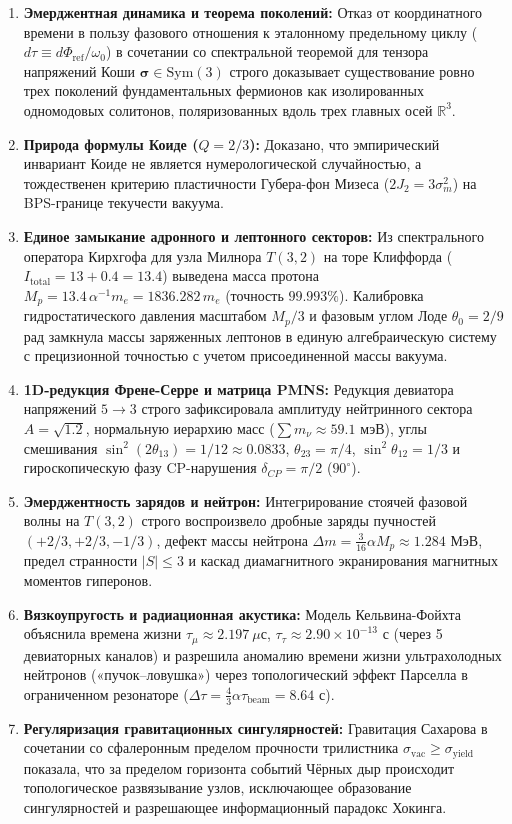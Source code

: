 \documentclass[12pt,a4paper]{article}
\begin{document}
\begin{enumerate}
	\item \textbf{Эмерджентная динамика и теорема поколений:} Отказ от координатного времени в пользу фазового отношения к эталонному предельному циклу ($d\tau \equiv d\Phi_{\text{ref}}/\omega_0$) в сочетании со спектральной теоремой для тензора напряжений Коши $\boldsymbol{\sigma} \in \mathrm{Sym}(3)$ строго доказывает существование ровно трех поколений фундаментальных фермионов как изолированных одномодовых солитонов, поляризованных вдоль трех главных осей $\mathbb{R}^3$.
	\item \textbf{Природа формулы Коиде ($Q = 2/3$):} Доказано, что эмпирический инвариант Коиде не является нумерологической случайностью, а тождественен критерию пластичности Губера-фон Мизеса ($2J_2 = 3\sigma_m^2$) на BPS-границе текучести вакуума.
	\item \textbf{Единое замыкание адронного и лептонного секторов:} Из спектрального оператора Кирхгофа для узла Милнора $T(3,2)$ на торе Клиффорда ($I_{\text{total}} = 13 + 0.4 = 13.4$) выведена масса протона $M_p = 13.4 \, \alpha^{-1} m_e = 1836.282 \, m_e$ (точность $99.993\%$). Калибровка гидростатического давления масштабом $M_p/3$ и фазовым углом Лоде $\theta_0 = 2/9$ рад замкнула массы заряженных лептонов в единую алгебраическую систему с прецизионной точностью с учетом присоединенной массы вакуума.
	\item \textbf{1D-редукция Френе-Серре и матрица PMNS:} Редукция девиатора напряжений $5 \to 3$ строго зафиксировала амплитуду нейтринного сектора $A = \sqrt{1.2}$, нормальную иерархию масс ($\sum m_\nu \approx 59.1$ мэВ), углы смешивания $\sin^2(2\theta_{13}) = 1/12 \approx 0.0833$, $\theta_{23} = \pi/4$, $\sin^2\theta_{12} = 1/3$ и гироскопическую фазу CP-нарушения $\delta_{CP} = \pi/2$ ($90^\circ$).
	\item \textbf{Эмерджентность зарядов и нейтрон:} Интегрирование стоячей фазовой волны на $T(3,2)$ строго воспроизвело дробные заряды пучностей $(+2/3, +2/3, -1/3)$, дефект массы нейтрона $\Delta m = \frac{3}{16}\alpha M_p \approx 1.284$ МэВ, предел странности $|S| \le 3$ и каскад диамагнитного экранирования магнитных моментов гиперонов.
	\item \textbf{Вязкоупругость и радиационная акустика:} Модель Кельвина-Фойхта объяснила времена жизни $\tau_\mu \approx 2.197 \ \mu\text{с}$, $\tau_\tau \approx 2.90 \times 10^{-13}$ с (через 5 девиаторных каналов) и разрешила аномалию времени жизни ультрахолодных нейтронов («пучок--ловушка») через топологический эффект Парселла в ограниченном резонаторе ($\Delta\tau = \frac{4}{3}\alpha\tau_{\text{beam}} = 8.64$ с).
	\item \textbf{Регуляризация гравитационных сингулярностей:} Гравитация Сахарова в сочетании со сфалеронным пределом прочности трилистника $\sigma_{\text{vac}} \ge \sigma_{\text{yield}}$ показала, что за пределом горизонта событий Чёрных дыр происходит топологическое развязывание узлов, исключающее образование сингулярностей и разрешающее информационный парадокс Хокинга.
\end{enumerate}
\end{document}
